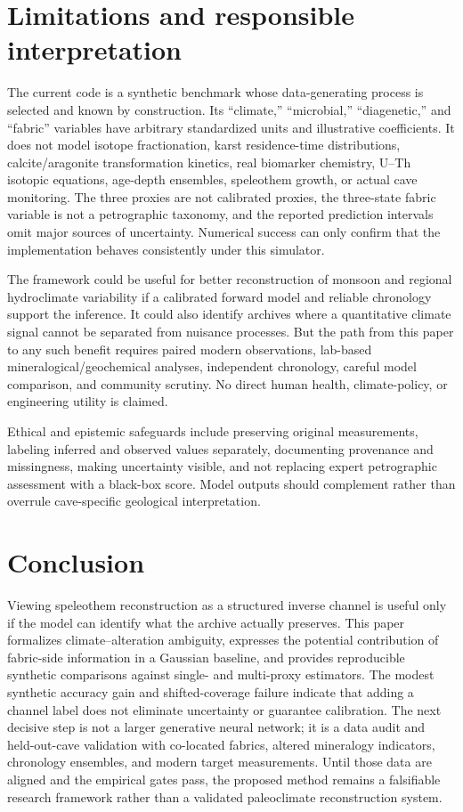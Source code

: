 \documentclass[11pt,a4paper]{article}
\begin{document}
\section{Limitations and responsible interpretation}
The current code is a synthetic benchmark whose data-generating process is selected and known by construction. Its “climate,” “microbial,” “diagenetic,” and “fabric” variables have arbitrary standardized units and illustrative coefficients. It does not model isotope fractionation, karst residence-time distributions, calcite/aragonite transformation kinetics, real biomarker chemistry, U--Th isotopic equations, age-depth ensembles, speleothem growth, or actual cave monitoring. The three proxies are not calibrated proxies, the three-state fabric variable is not a petrographic taxonomy, and the reported prediction intervals omit major sources of uncertainty. Numerical success can only confirm that the implementation behaves consistently under this simulator.

The framework could be useful for better reconstruction of monsoon and regional hydroclimate variability if a calibrated forward model and reliable chronology support the inference. It could also identify archives where a quantitative climate signal cannot be separated from nuisance processes. But the path from this paper to any such benefit requires paired modern observations, lab-based mineralogical/geochemical analyses, independent chronology, careful model comparison, and community scrutiny. No direct human health, climate-policy, or engineering utility is claimed.

Ethical and epistemic safeguards include preserving original measurements, labeling inferred and observed values separately, documenting provenance and missingness, making uncertainty visible, and not replacing expert petrographic assessment with a black-box score. Model outputs should complement rather than overrule cave-specific geological interpretation.

\section{Conclusion}
Viewing speleothem reconstruction as a structured inverse channel is useful only if the model can identify what the archive actually preserves. This paper formalizes climate–alteration ambiguity, expresses the potential contribution of fabric-side information in a Gaussian baseline, and provides reproducible synthetic comparisons against single- and multi-proxy estimators. The modest synthetic accuracy gain and shifted-coverage failure indicate that adding a channel label does not eliminate uncertainty or guarantee calibration. The next decisive step is not a larger generative neural network; it is a data audit and held-out-cave validation with co-located fabrics, altered mineralogy indicators, chronology ensembles, and modern target measurements. Until those data are aligned and the empirical gates pass, the proposed method remains a falsifiable research framework rather than a validated paleoclimate reconstruction system.
\end{document}
